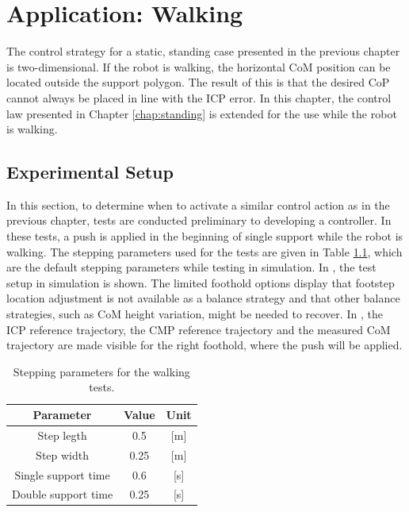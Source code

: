%
\chapter{Application: Walking}\label{chap:walking}
The control strategy for a static, standing case presented in the previous chapter is two-dimensional. If the robot is walking, the horizontal \ac{CoM} position can be located outside the support polygon. The result of this is that the desired \ac{CoP} cannot always be placed in line with the \ac{ICP} error.  In this chapter, the control law presented in Chapter \ref{chap:standing} is extended for the use while the robot is walking.
\section{Experimental Setup}
In this section, to determine when to activate a similar control action as in the previous chapter, tests are conducted preliminary to developing a controller. In these tests, a push is applied in the beginning of single support while the robot is walking. The stepping parameters used for the tests are given in Table \ref{tab:stepping}, which are the default stepping parameters while testing in simulation. In , the test setup in simulation is shown. The limited foothold options display that footstep location adjustment is not available as a balance strategy and that other balance strategies, such as \ac{CoM} height variation, might be needed to recover. In , the \ac{ICP} reference trajectory, the \ac{CMP} reference trajectory and the measured \ac{CoM} trajectory are made visible for the right foothold, where the push will be applied. 
\begin{table}
\caption{Stepping parameters for the walking tests.} %
\centering %
\begin{tabular}{c c c } %
\hline\hline %
Parameter & Value & Unit \\
\hline %
Step legth & 0.5 &  [m]\\
Step width & 0.25 & [m]\\
Single support time & 0.6 & [s]\\
Double support time & 0.25 & [s]\\
\hline %
\end{tabular}
\label{tab:stepping} %
\end{table}
